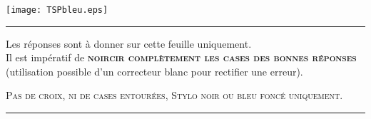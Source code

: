 


\ifLogoTSP
\noindent
\texttt{[image: TSPbleu.eps]}
\begin{minipage}[b]{5cm}%
  \centering\large\bf 
  \titreExam
\end{minipage}
\else %
\begin{minipage}[b]{0.4\linewidth}
  \centering\large\bf
  \titreExam
\end{minipage}
\fi

\begin{center}
  \hrule  \vspace{1em}
  {{Les réponses sont à donner sur cette feuille uniquement.}} \\
  
  Il est impératif de \textsc{\textbf{noircir complètement les cases
      des bonnes réponses}} \\ (utilisation possible d'un correcteur
  blanc pour rectifier une erreur).
  

  \textsc{Pas de croix, ni de cases entourées, Stylo noir ou bleu
    foncé uniquement.}

  \vspace{1em}  \hrule
\end{center}
\vspace{1ex}
